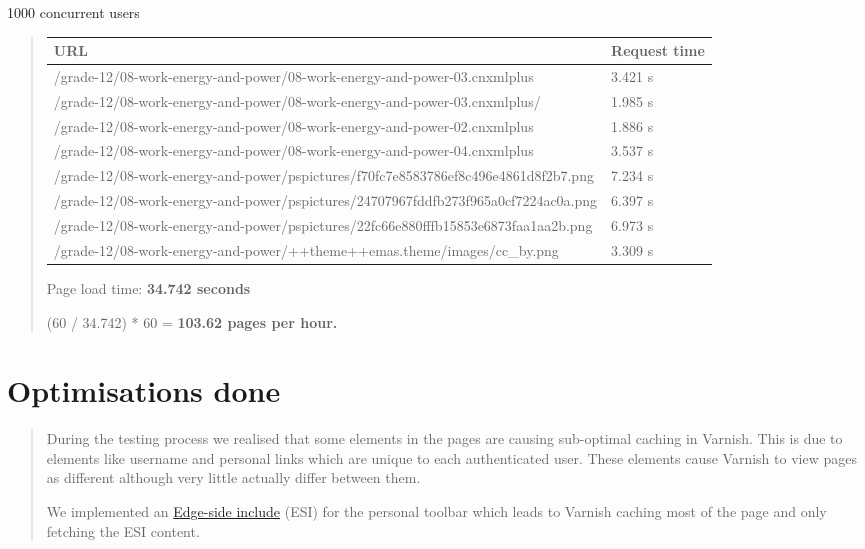 \documentclass[letterpaper,10pt,english]{sphinxmanual}
\begin{document}
1000 concurrent users
\begin{quote}

\begin{tabulary}{\linewidth}{|L|L|}
\hline
\textbf{\relax 
URL
} & \textbf{\relax 
Request time
}\\\hline

/grade-12/08-work-energy-and-power/08-work-energy-and-power-03.cnxmlplus
 & 
3.421 s
\\\hline

/grade-12/08-work-energy-and-power/08-work-energy-and-power-03.cnxmlplus/
 & 
1.985 s
\\\hline

/grade-12/08-work-energy-and-power/08-work-energy-and-power-02.cnxmlplus
 & 
1.886 s
\\\hline

/grade-12/08-work-energy-and-power/08-work-energy-and-power-04.cnxmlplus
 & 
3.537 s
\\\hline

/grade-12/08-work-energy-and-power/pspictures/f70fc7e8583786ef8c496e4861d8f2b7.png
 & 
7.234 s
\\\hline

/grade-12/08-work-energy-and-power/pspictures/24707967fddfb273f965a0cf7224ac0a.png
 & 
6.397 s
\\\hline

/grade-12/08-work-energy-and-power/pspictures/22fc66e880fffb15853e6873faa1aa2b.png
 & 
6.973 s
\\\hline

/grade-12/08-work-energy-and-power/++theme++emas.theme/images/cc\_by.png
 & 
3.309 s
\\\hline
\end{tabulary}


Page load time: \textbf{34.742 seconds}

(60 / 34.742) * 60 = \textbf{103.62 pages per hour.}
\end{quote}


\section{Optimisations done}
\label{index:optimisations-done}\begin{quote}

During the testing process we realised that some elements in the pages are
causing sub-optimal caching in Varnish.  This is due to elements like
username and personal links which are unique to each authenticated user.
These elements cause Varnish to view pages as different although very little
actually differ between them.

We implemented an \href{http://en.wikipedia.org/wiki/Edge\_Side\_Includes}{Edge-side include} (ESI) for the personal toolbar which
leads to Varnish caching most of the page and only fetching the ESI content.
\end{quote}
\end{document}
